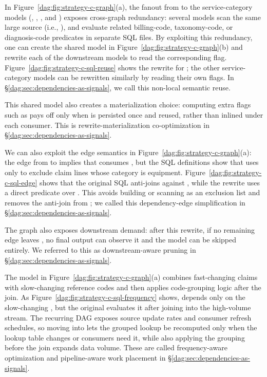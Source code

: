 In Figure~\ref{dag:fig:strategy-c-graph}(a), the fanout from  to the service-category models (, , , and )
exposes cross-graph redundancy: several models scan the same large source (i.e., ), and evaluate related billing-code, taxonomy-code, or diagnosis-code predicates in separate SQL files. By exploiting this redundancy, one can create the shared  model in Figure~\ref{dag:fig:strategy-c-graph}(b) and rewrite each of the downstream models  to read the corresponding flag. Figure~\ref{dag:fig:strategy-c-sql-reuse} shows the rewrite for ; the other service-category models can be rewritten similarly by reading their own flags.
In \S\ref{dag:sec:dependencies-as-signals}, we call this non-local semantic reuse.

This shared model also creates a materialization choice: computing extra flags such as  pays off only when  is persisted once and reused, rather than inlined under each consumer. This is rewrite-materialization co-optimization in \S\ref{dag:sec:dependencies-as-signals}.


We can also exploit the edge semantics in Figure~\ref{dag:fig:strategy-c-graph}(a): the edge from  to  implies that  consumes , but the SQL definitions show that  uses  only to exclude claim lines whose category is equipment. 
Figure~\ref{dag:fig:strategy-c-sql-edge} shows that the original  SQL anti-joins against , while the rewrite uses a direct predicate over . This avoids building or scanning  as an exclusion list and removes the anti-join from ;  we called this dependency-edge simplification in \S\ref{dag:sec:dependencies-as-signals}.

The graph also exposes downstream demand: after this rewrite, if no remaining edge leaves , no final output can observe it and the model can be skipped entirely. We referred to this as downstream-aware pruning in \S\ref{dag:sec:dependencies-as-signals}.

The  model in Figure~\ref{dag:fig:strategy-c-graph}(a) combines fast-changing claims with slow-changing reference codes and then applies code-grouping logic after the join. 
As Figure~\ref{dag:fig:strategy-c-sql-frequency} shows,  depends only on the slow-changing , but the original  evaluates it after joining into the high-volume  stream. The recurring DAG exposes source update rates and consumer refresh schedules, so moving  into  lets the grouped lookup be recomputed only when the lookup table changes or consumers need it, while also applying the grouping before the join expands data volume. These are called frequency-aware optimization and pipeline-aware work placement in \S\ref{dag:sec:dependencies-as-signals}.


